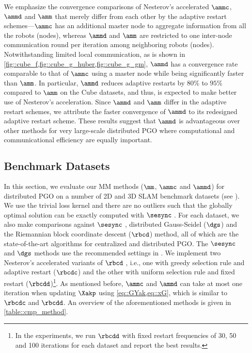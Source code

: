 We emphasize the convergence comparisons of Nesterov's accelerated $\ammc$, $\ammd$ and $\amm$ that merely differ from each other by the adaptive restart schemes---$\ammc$ has an additional master node to aggregate information from all the robots (nodes), whereas $\ammd$ and $\amm$ are restricted to one inter-node communication round per iteration among neighboring robots (nodes). Notwithstanding limited local communication, as is shown in \cref{fig::cube_f,fig::cube_g_huber,fig::cube_g_gm}, $\ammd$ has a convergence rate comparable to that of $\ammc$ using a master node while being significantly faster than $\amm$.  {\highlight In particular,  $\ammd$ reduces adaptive restarts by $80\%$ to $95\%$ compared to $\amm$ on the \textsf{\small Cube} datasets}, and thus, is expected to make better use of Nesterov's acceleration. Since $\ammd$ and $\amm$ differ in the adaptive restart schemes, we attribute the faster convergence of $\ammd$ to its redesigned adaptive restart scheme. These results suggest that $\ammd$ is advantageous over other methods for very large-scale distributed PGO where computational and communicational efficiency are equally important.

\vspace{-0.5em}

%



\vspace{-0.5em}
\subsection{Benchmark Datasets}\label{subsection::experiment::benchmark}
In this section, we evaluate our MM methods ($\mm$, $\ammc$ and $\ammd$) for distributed PGO on a number of 2D and 3D SLAM benchmark datasets \cite{rosen2016se} (see \datasetinfo). We use the trivial loss kernel and there are no outliers such that the globally optimal solution can be exactly computed with $\sesync$ \cite{rosen2016se}. For each dataset, we also make comparisons against $\sesync$ \cite{rosen2016se}, distributed Gauss-Seidel ($\dgs$) \cite{choudhary2017distributed} and the Riemannian block coordinate descent ($\rbcd$) \cite{tian2019distributed} method, all of which are the state-of-the-art algorithms for centralized and distributed PGO. The $\sesync$ and $\dgs$ methods use the recommended settings in \cite{choudhary2017distributed,rosen2016se}. We implement two Nesterov's accelerated variants of $\rbcd$  \cite{tian2019distributed}, i.e., one with greedy selection rule and adaptive restart ($\rbcdc$) and the other with uniform selection rule and fixed restart ($\rbcdd$)\footnote{In the experiments, we run $\rbcdd$ \cite{tian2019distributed} with fixed restart frequencies of 30, 50 and 100 iterations for each dataset and report the best results.}. As mentioned before, $\ammc$ and $\ammd$ can take at most one iteration when updating $\Xakp$ using \cref{eq::GYak,eq::xG}, which is similar to $\rbcdc$ and $\rbcdd$. An overview of the aforementioned methods is given in \cref{table::cmp_method}.

